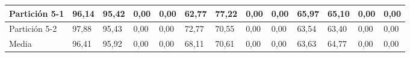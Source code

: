 \documentclass[10pt,a4paper]{article}
\begin{document}
\begin{table}[H]
{\begin{tabular}{|l|l|l|l|l|l|l|l|l|l|l|l|l|}
Partición 5-1                              & 96,14        & 95,42         & 0,00    & 0,00 & 62,77        & 77,22         & 0,00    & 0,00 & 65,97        & 65,10         & 0,00    & 0,00 \\ \hline
Partición 5-2                              & 97,88        & 95,43         & 0,00    & 0,00 & 72,77        & 70,55         & 0,00    & 0,00 & 63,54        & 63,40         & 0,00    & 0,00 \\ \hline
Media                                      & 96,41        & 95,92         & 0,00    & 0,00 & 68,11        & 70,61         & 0,00    & 0,00 & 63,63        & 64,77         & 0,00    & 0,00 \\ \hline
\end{tabular}}
\end{table}

\end{document}
